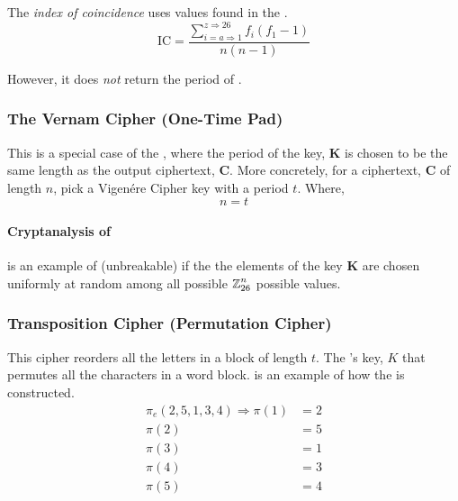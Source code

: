 \begin{definition}\label{def:Index_of_Coincidence}
  The \emph{index of coincidence} uses values found in the .
  \begin{equation}\label{eq:Index_of_Coincidence}
    \mathrm{IC} = \frac{\sum\limits_{i=a\Rightarrow1}^{z\Rightarrow26} f_{i} \left( f_{1} - 1 \right)}{n(n-1)}
  \end{equation}

  However, it does \emph{not} return the period of .
\end{definition}

\subsubsection{The Vernam Cipher (One-Time Pad)}\label{subsubsec:The_Vernam_Cipher}
This is a special case of the , where the period of the key, $\mathbf{K}$ is chosen to be the same length as the output ciphertext, $\mathbf{C}$.
More concretely, for a ciphertext, $\mathbf{C}$ of length $n$, pick a Vigen\'{e}re Cipher key with a period $t$.
Where,
\begin{equation*}
  n = t
\end{equation*}

\paragraph{Cryptanalysis of }
 is an example of  (unbreakable) if the the elements of the key $\mathbf{K}$ are chosen uniformly at random among all possible $\operatorname{\mathbb{Z}}_{26}^{n}$ possible values.

\subsubsection{Transposition Cipher (Permutation Cipher)}\label{subsubsec:Transposition_Cipher}
This cipher reorders all the letters in a block of length $t$.
The 's key, $K$ that permutes all the characters in a word block.
 is an example of how the  is constructed.
\begin{equation}\label{eq:Transposition_Cipher-Encryption}
  \begin{aligned}
    \pi_{e}(2, 5, 1, 3, 4) \Longrightarrow \pi(1) &= 2 \\
    \pi(2) &= 5 \\
    \pi(3) &= 1 \\
    \pi(4) &= 3 \\
    \pi(5) &= 4 \\
  \end{aligned}
\end{equation}

